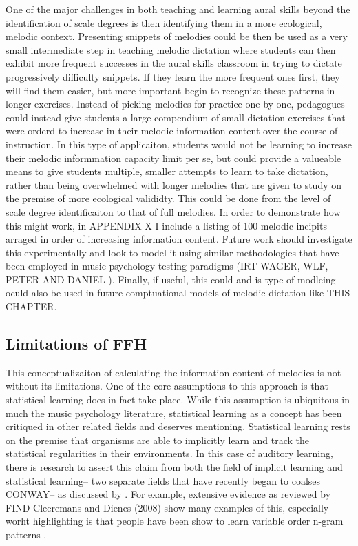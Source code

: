 \documentclass[]{book}
\begin{document}
One of the major challenges in both teaching and learning aural skills beyond the identification of scale degrees is then identifying them in a more ecological, melodic context.
Presenting snippets of melodies could be then be used as a very small intermediate step in teaching melodic dictation where students can then exhibit more frequent successes in the aural skills classroom in trying to dictate progressively difficulty snippets.
If they learn the more frequent ones first, they will find them easier, but more important begin to recognize these patterns in longer exercises.
Instead of picking melodies for practice one-by-one, pedagogues could instead give students a large compendium of small dictation exercises that were orderd to increase in their melodic information content over the course of instruction.
In this type of applicaiton, students would not be learning to increase their melodic informmation capacity limit per se, but could provide a valueable means to give students multiple, smaller attempts to learn to take dictation, rather than being overwhelmed with longer melodies that are given to study on the premise of more ecological valididty.
This could be done from the level of scale degree identificaiton to that of full melodies.
In order to demonstrate how this might work, in APPENDIX X I include a listing of 100 melodic incipits arraged in order of increasing information content.
Future work should investigate this experimentally and look to model it using similar methodologies that have been employed in music psychology testing paradigms (IRT WAGER, WLF, PETER AND DANIEL ).
Finally, if useful, this could and is type of modleing oculd also be used in future comptuational models of melodic dictation like THIS CHAPTER.

\hypertarget{limitations-of-ffh}{%
\subsection{Limitations of FFH}\label{limitations-of-ffh}}

This conceptualizaiton of calculating the information content of melodies is not without its limitations.
One of the core assumptions to this approach is that statistical learning does in fact take place.
While this assumption is ubiquitous in much the music psychology literature, statistical learning as a concept has been critiqued in other related fields and deserves mentioning.
Statistical learning rests on the premise that organisms are able to implicitly learn and track the statistical regularities in their environments.
In this case of auditory learning, there is research to assert this claim from both the field of implicit learning and statistical learning-- two separate fields that have recently began to coalses CONWAY-- as discussed by \citet{perruchetImplicitLearningStatistical2006}.
For example, extensive evidence as reviewed by FIND Cleeremans and Dienes (2008) show many examples of this, especially worht highlighting is that people have been show to learn variable order n-gram patterns \citep{remillardImplicitLearningFirst2001}.
\end{document}
